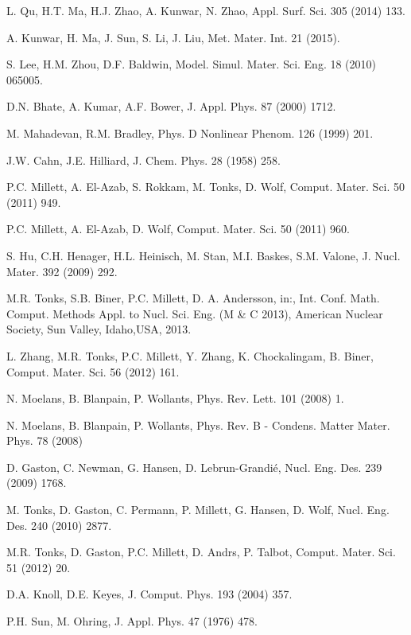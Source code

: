\documentclass[10pt,a4paper]{article}
\begin{document}
\begin{thebibliography}{00}

 L. Qu, H.T. Ma, H.J. Zhao, A. Kunwar, N. Zhao, Appl. Surf. Sci. 305 (2014) 133.

 A. Kunwar, H. Ma, J. Sun, S. Li, J. Liu, Met. Mater. Int. 21 (2015).

 S. Lee, H.M. Zhou, D.F. Baldwin, Model. Simul. Mater. Sci. Eng. 18 (2010) 065005.

 D.N. Bhate, A. Kumar, A.F. Bower, J. Appl. Phys. 87 (2000) 1712.

 M. Mahadevan, R.M. Bradley, Phys. D Nonlinear Phenom. 126 (1999) 201.

 J.W. Cahn, J.E. Hilliard, J. Chem. Phys. 28 (1958) 258.

 P.C. Millett, A. El-Azab, S. Rokkam, M. Tonks, D. Wolf, Comput. Mater. Sci. 50 (2011) 949.

 P.C. Millett, A. El-Azab, D. Wolf, Comput. Mater. Sci. 50 (2011) 960.

 S. Hu, C.H. Henager, H.L. Heinisch, M. Stan, M.I. Baskes, S.M. Valone, J. Nucl. Mater. 392 (2009) 292.

 M.R. Tonks, S.B. Biner, P.C. Millett, D. A. Andersson, in:, Int. Conf. Math. Comput. Methods Appl. to Nucl. Sci. Eng. (M \& C 2013), American Nuclear Society, Sun Valley, Idaho,USA, 2013.

 L. Zhang, M.R. Tonks, P.C. Millett, Y. Zhang, K. Chockalingam, B. Biner, Comput. Mater. Sci. 56 (2012) 161. 

 N. Moelans, B. Blanpain, P. Wollants, Phys. Rev. Lett. 101 (2008) 1.

 N. Moelans, B. Blanpain, P. Wollants, Phys. Rev. B - Condens. Matter Mater. Phys. 78 (2008)

 D. Gaston, C. Newman, G. Hansen, D. Lebrun-Grandié, Nucl. Eng. Des. 239 (2009) 1768.

 M. Tonks, D. Gaston, C. Permann, P. Millett, G. Hansen, D. Wolf, Nucl. Eng. Des. 240 (2010) 2877.

 M.R. Tonks, D. Gaston, P.C. Millett, D. Andrs, P. Talbot, Comput. Mater. Sci. 51 (2012) 20.

 D.A. Knoll, D.E. Keyes, J. Comput. Phys. 193 (2004) 357.

  P.H. Sun, M. Ohring, J. Appl. Phys. 47 (1976) 478.


\end{thebibliography}
\end{document}
